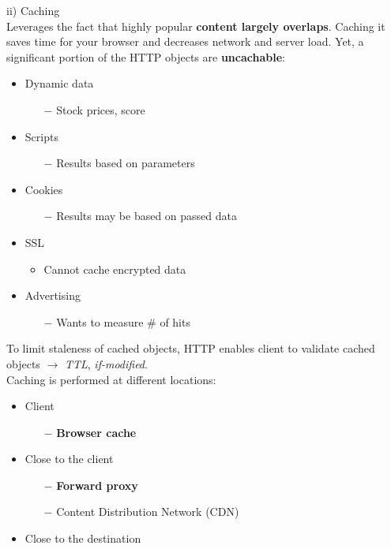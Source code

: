\documentclass[a4paper, fontsize=8pt, landscape, DIV=1]{scrartcl}
\begin{document}
\begin{multicols*}{4}
		ii) Caching\\
		Leverages the fact that highly popular \textbf{content largely overlaps}. Caching it saves time for your browser and decreases network and server load. Yet, a significant portion of the HTTP objects are \textbf{uncachable}:
		\begin{itemize}[noitemsep]
			\item Dynamic data
			\begin{itemize}
				\item[$-$] Stock prices, score
			\end{itemize}
			\item Scripts
			\begin{itemize}
				\item[$-$] Results based on parameters
 			\end{itemize}
 			\item Cookies
 			\begin{itemize}
 				\item[$-$] Results may be based on passed data
 			\end{itemize}
 			\item SSL
 			\begin{itemize}
 				\item Cannot cache encrypted data 
 			\end{itemize}
 			\item Advertising
 			\begin{itemize}
 				\item[$-$] Wants to measure \# of hits
 			\end{itemize}
		\end{itemize}
		To limit staleness of cached objects, HTTP enables client to validate cached objects $\rightarrow$ \textit{TTL}, \textit{if-modified}.\\
		Caching is performed at different locations:
		\begin{itemize}[noitemsep]
			\item Client
			\begin{itemize}
				\item[$-$] \textbf{Browser cache}
			\end{itemize}
			\item Close to the client
			\begin{itemize}
				\item[$-$] \textbf{Forward proxy}
				\item[$-$] Content Distribution Network (CDN)
			\end{itemize}
			\item Close to the destination 

\end{itemize}
\end{multicols*}
\end{document}
